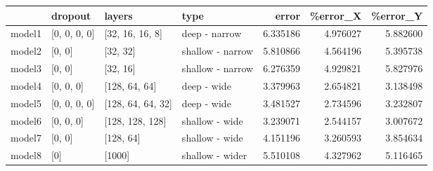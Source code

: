 \begin{tabular}{llllrrr}
\toprule
{} &       dropout &             layers &              type &     error &  \%error\_X &  \%error\_Y \\
\midrule
model1 &  [0, 0, 0, 0] &    [32, 16, 16, 8] &     deep - narrow &  6.335186 &  4.976027 &  5.882600 \\
model2 &        [0, 0] &           [32, 32] &  shallow - narrow &  5.810866 &  4.564196 &  5.395738 \\
model3 &        [0, 0] &           [32, 16] &  shallow - narrow &  6.276359 &  4.929821 &  5.827976 \\
model4 &     [0, 0, 0] &      [128, 64, 64] &       deep - wide &  3.379963 &  2.654821 &  3.138498 \\
model5 &  [0, 0, 0, 0] &  [128, 64, 64, 32] &       deep - wide &  3.481527 &  2.734596 &  3.232807 \\
model6 &     [0, 0, 0] &    [128, 128, 128] &    shallow - wide &  3.239071 &  2.544157 &  3.007672 \\
model7 &        [0, 0] &          [128, 64] &    shallow - wide &  4.151196 &  3.260593 &  3.854634 \\
model8 &           [0] &             [1000] &   shallow - wider &  5.510108 &  4.327962 &  5.116465 \\
\bottomrule
\end{tabular}
